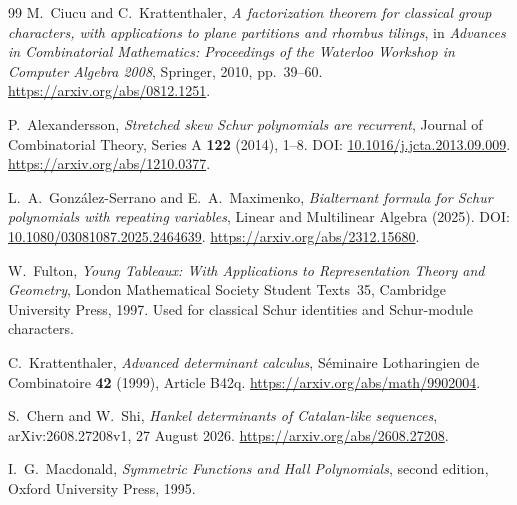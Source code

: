 \documentclass[11pt]{article}
\theoremstyle{definition}
\theoremstyle{remark}
\theoremstyle{definition}
\theoremstyle{plain}
\numberwithin{equation}{section}
\begin{document}
\begin{thebibliography}{99}
M.~Ciucu and C.~Krattenthaler,
\emph{A factorization theorem for classical group characters, with applications
to plane partitions and rhombus tilings}, in
\emph{Advances in Combinatorial Mathematics: Proceedings of the Waterloo
Workshop in Computer Algebra 2008}, Springer, 2010, pp.~39--60.
\url{https://arxiv.org/abs/0812.1251}.

P.~Alexandersson,
\emph{Stretched skew Schur polynomials are recurrent},
Journal of Combinatorial Theory, Series A \textbf{122} (2014), 1--8.
DOI: \href{https://doi.org/10.1016/j.jcta.2013.09.009}{10.1016/j.jcta.2013.09.009}.
\url{https://arxiv.org/abs/1210.0377}.

L.~A.~Gonz\'alez-Serrano and E.~A.~Maximenko,
\emph{Bialternant formula for Schur polynomials with repeating variables},
Linear and Multilinear Algebra (2025).
DOI: \href{https://doi.org/10.1080/03081087.2025.2464639}{10.1080/03081087.2025.2464639}.
\url{https://arxiv.org/abs/2312.15680}.

W.~Fulton,
\emph{Young Tableaux: With Applications to Representation Theory and Geometry},
London Mathematical Society Student Texts~35, Cambridge University Press,
1997. Used for classical Schur identities and Schur-module characters.

C.~Krattenthaler, \emph{Advanced determinant calculus},
S\'eminaire Lotharingien de Combinatoire \textbf{42} (1999), Article B42q.
\url{https://arxiv.org/abs/math/9902004}.

S.~Chern and W.~Shi, \emph{Hankel determinants of Catalan-like sequences},
arXiv:2608.27208v1, 27 August 2026.
\url{https://arxiv.org/abs/2608.27208}.

I.~G.~Macdonald,
\emph{Symmetric Functions and Hall Polynomials}, second edition,
Oxford University Press, 1995.
\end{thebibliography}
\end{document}
